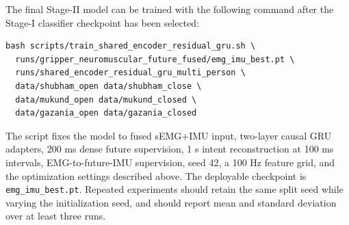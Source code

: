 The final Stage-II model can be trained with the following command after the
Stage-I classifier checkpoint has been selected:
\begin{verbatim}
bash scripts/train_shared_encoder_residual_gru.sh \
  runs/gripper_neuromuscular_future_fused/emg_imu_best.pt \
  runs/shared_encoder_residual_gru_multi_person \
  data/shubham_open data/shubham_close \
  data/mukund_open data/mukund_closed \
  data/gazania_open data/gazania_closed
\end{verbatim}
The script fixes the model to fused sEMG+IMU input, two-layer causal GRU
adapters, 200 ms dense future supervision, 1 s intent reconstruction at 100 ms
intervals, EMG-to-future-IMU supervision, seed 42, a 100 Hz feature grid, and
the optimization settings described above.  The deployable checkpoint is
\texttt{emg\_imu\_best.pt}.  Repeated experiments should retain
the same split seed while varying the initialization seed, and should report
mean and standard deviation over at least three runs.
